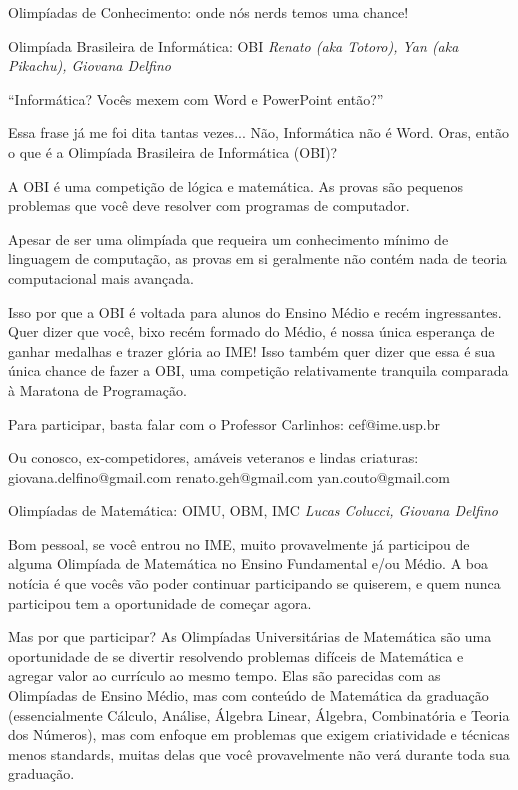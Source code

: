 \begin{secao}{Olimpíadas de Conhecimento: onde nós nerds temos uma chance!}

\begin{subsecao}{Olimpíada Brasileira de Informática: OBI}
{\em Renato (aka Totoro), Yan (aka Pikachu), Giovana Delfino} %

``Informática? Vocês mexem com Word e PowerPoint então?''

Essa frase já me foi dita tantas vezes... Não, Informática não é Word.
Oras, então o que é a Olimpíada Brasileira de Informática (OBI)?

A OBI é uma competição de lógica e matemática. As provas são pequenos
problemas que você deve resolver com programas de computador.

Apesar de ser uma olimpíada que requeira um conhecimento mínimo de 
linguagem de computação, as provas em si geralmente não contém nada 
de teoria computacional mais avançada. 

Isso por que a OBI é voltada para alunos do Ensino Médio e recém
ingressantes. Quer dizer que você, bixo recém formado do Médio,
é nossa única esperança de ganhar medalhas e trazer glória ao IME!
Isso também quer dizer que essa é sua única chance de fazer a OBI,
uma competição relativamente tranquila comparada à Maratona de 
Programação.

Para participar, basta falar com o Professor Carlinhos:
cef@ime.usp.br

Ou conosco, ex-competidores, amáveis veteranos e lindas criaturas:
giovana.delfino@gmail.com
renato.geh@gmail.com
yan.couto@gmail.com

\end{subsecao}

\begin{subsecao}{Olimpíadas de Matemática: OIMU, OBM, IMC}
{\em Lucas Colucci, Giovana Delfino} %

Bom pessoal, se você entrou no IME, muito provavelmente já participou
de alguma Olimpíada de Matemática no Ensino Fundamental e/ou Médio. A 
boa notícia é que vocês vão poder continuar participando se quiserem,
e quem nunca participou tem a oportunidade de começar agora.

Mas por que participar? As Olimpíadas Universitárias de Matemática são uma
oportunidade de se divertir resolvendo problemas difíceis de Matemática e agregar
valor ao currículo ao mesmo tempo. Elas são parecidas com as Olimpíadas de
Ensino Médio, mas com conteúdo de Matemática da graduação (essencialmente 
Cálculo, Análise, Álgebra Linear, Álgebra, Combinatória e Teoria dos Números), 
mas com enfoque em problemas que exigem criatividade e técnicas menos standards,
muitas delas que você provavelmente não verá durante toda sua graduação.


\end{subsecao}
\end{secao}
